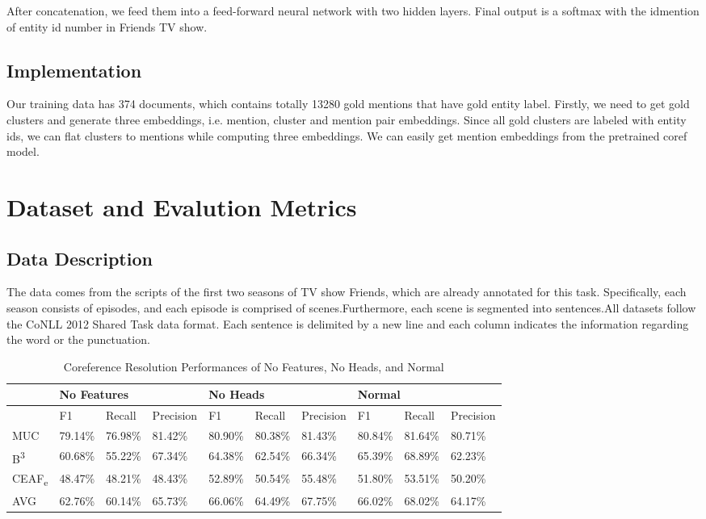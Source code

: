 \documentclass[11pt]{article}
\begin{document}
After concatenation, we feed them into a feed-forward neural network with two hidden layers. Final output is a softmax with the idmention of entity id number in Friends TV show.

\subsection{Implementation}
Our training data has 374 documents, which contains totally 13280 gold mentions that have gold entity label. Firstly, we need to get gold clusters and generate three embeddings, i.e. mention, cluster and mention pair embeddings. Since all gold clusters are labeled with entity ids, we can flat clusters to mentions while computing three embeddings. We can easily get mention embeddings from the pretrained coref model.


\section{Dataset and Evalution Metrics}
\subsection{Data Description}
The data comes from the scripts of the first two seasons of TV show Friends, which are already annotated for this task. Specifically, each season consists of episodes, and each episode is comprised of scenes.Furthermore, each scene is segmented into sentences.All datasets follow the CoNLL 2012 Shared Task data format. Each sentence is delimited by a new line and each column indicates the information regarding the word or the punctuation.
\begin{table}[]
\centering
\label{my-label}
\begin{tabular}{|l|l|l|l|l|l|l|l|l|l|}
\hline
        & \multicolumn{3}{l|}{No Features} & \multicolumn{3}{l|}{No Heads} & \multicolumn{3}{l|}{Normal}   \\ \hline
        & F1       & Recall   & Precision  & F1      & Recall  & Precision & F1      & Recall  & Precision \\ \hline
MUC     & 79.14\%  & 76.98\%  & 81.42\%    & 80.90\% & 80.38\% & 81.43\%   & 80.84\% & 81.64\% & 80.71\%   \\ \hline
B\textsuperscript{3}      & 60.68\%  & 55.22\%  & 67.34\%    & 64.38\% & 62.54\% & 66.34\%   & 65.39\% & 68.89\% & 62.23\%   \\ \hline
CEAF\textsubscript{e} & 48.47\%  & 48.21\%  & 48.43\%    & 52.89\% & 50.54\% & 55.48\%   & 51.80\% & 53.51\% & 50.20\%   \\ \hline
AVG     & 62.76\%  & 60.14\%  & 65.73\%    & 66.06\% & 64.49\% & 67.75\%   & 66.02\% & 68.02\% & 64.17\%   \\ \hline
\end{tabular}
\caption{Coreference Resolution Performances of No Features, No Heads, and Normal}
\end{table}
\end{document}
